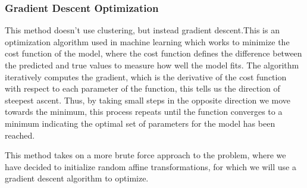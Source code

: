\documentclass[a4paper,11pt, titlepage]{article}
\theoremstyle{definition}
\theoremstyle{plain}
\theoremstyle{remark}
\theoremstyle{definition}
\begin{document}
   \subsubsection{Gradient Descent Optimization}
   This method doesn't use clustering, but instead gradient descent.This is an optimization algorithm used in machine learning which works to minimize the cost function of the model, where the cost function defines the difference between the predicted and true values to measure how well the model fits. The algorithm iteratively computes the gradient, which is the derivative of the cost function with respect to each parameter of the function, this tells us the direction of steepest ascent. Thus, by taking small steps in the opposite direction we move towards the minimum, this process repeats until the function converges to a minimum indicating the optimal set of parameters for the model has been reached.\cite{vidhya2020gradientdescent} 

   This method takes on a more brute force approach to the problem, where we have decided to initialize random affine transformations, for which we will use a gradient descent algorithm to optimize. 
\end{document}
